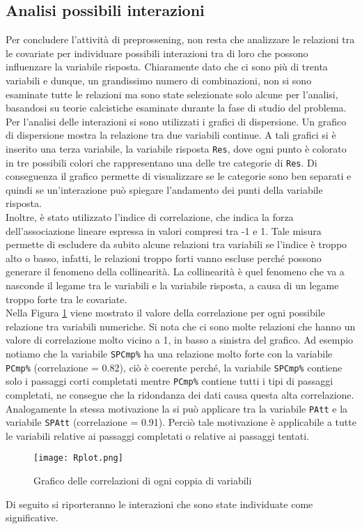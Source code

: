 \subsection{Analisi possibili interazioni} 
Per concludere l'attività di preprossening, non resta che analizzare le relazioni tra le covariate per individuare possibili interazioni tra di loro che possono influenzare la variabile risposta. Chiaramente dato che ci sono più di trenta variabili e dunque, un grandissimo numero di combinazioni, non si sono esaminate tutte le relazioni ma sono state selezionate solo alcune per l'analisi, basandosi su teorie calcistiche esaminate durante la fase di studio del problema.\\
Per l'analisi delle interazioni si sono utilizzati i grafici di dispersione. Un grafico di dispersione mostra la relazione tra due variabili continue. A tali grafici si è inserito una terza variabile, la variabile risposta \texttt{Res}, dove ogni punto è colorato in tre possibili colori che rappresentano una delle tre categorie di \texttt{Res}. Di conseguenza il grafico permette di visualizzare se le categorie sono ben separati e quindi se un'interazione può spiegare l'andamento dei punti della variabile risposta.\\
Inoltre, è stato utilizzato l'indice di correlazione, che indica la forza dell'associazione lineare espressa in valori compresi tra -1 e 1. Tale misura permette di escludere da subito alcune relazioni tra variabili se l'indice è troppo alto o basso, infatti, le relazioni troppo forti vanno escluse perché possono generare il fenomeno della collinearità. La collinearità è quel fenomeno che va a nasconde il legame tra le variabili e la variabile risposta, a causa di un legame troppo forte tra le covariate.\\
Nella Figura \ref{fig:cor} viene mostrato il valore della correlazione per ogni possibile relazione tra variabili numeriche. Si nota che ci sono molte relazioni che hanno un valore di correlazione molto vicino a 1, in basso a sinistra del grafico. Ad esempio notiamo che la variabile \texttt{SPCmp\%} ha una relazione molto forte con la variabile \texttt{PCmp\%} (correlazione = 0.82), ciò è coerente perché, la variabile \texttt{SPCmp\%} contiene solo i passaggi corti completati mentre \texttt{PCmp\%} contiene tutti i tipi di passaggi completati, ne consegue che la ridondanza dei dati causa questa alta correlazione. Analogamente la stessa motivazione la si può applicare tra la variabile \texttt{PAtt} e la variabile \texttt{SPAtt} (correlazione = 0.91). Perciò tale motivazione è applicabile a tutte le variabili relative ai passaggi completati o relative ai passaggi tentati.
\begin{figure}[htbp]
	\begin{center}
		\texttt{[image: Rplot.png]}
		\caption{Grafico delle correlazioni di ogni coppia di variabili}  \label{fig:cor}
	\end{center}
\end{figure}
Di seguito si riporteranno le interazioni che sono state individuate come significative.\\ 

